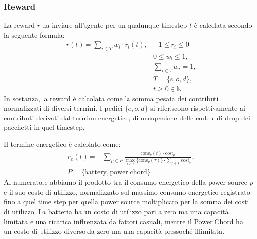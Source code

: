 \documentclass[conference]{IEEEtran}
\begin{document}
\subsubsection{Reward}
La reward $r$ da inviare all'agente per un qualunque timestep $t$ è calcolata secondo la
seguente formula:
\begin{equation}
    \label{eq:reward}
    \begin{aligned}
        & r(t) = \sum_{i \in T} w_i \cdot r_i(t), & -1 \leq r_i \leq 0\\
        && 0 \leq w_i \leq 1, \\
        && \sum_{i \in T} w_i = 1, \\
        && T = \{e, o, d\},\\
        && t \geq 0 \in \mathbb{N}
    \end{aligned}
\end{equation}
In sostanza, la reward è calcolata come la somma pesata dei contributi normalizzati di
diversi termini.
I pedici $\{e, o, d\}$ si riferiscono rispettivamente ai contributi derivati dal termine
energetico, di occupazione delle code e di drop dei pacchetti in quel timestep.

Il termine energetico è calcolato come:
\begin{equation}
    \label{eq:reward_energy}
    \begin{aligned}
        & r_e(t) = -\sum_{p \in P}\frac{\text{cons}_p(t) \cdot \text{cost}_p}{\max_{\tau < t}\{\text{cons}_p(\tau)\} \cdot \sum_{p \in P}\text{cost}_p},\\
        & P = \{\text{battery}, \text{power chord}\} 
    \end{aligned}
\end{equation}
Al numeratore abbiamo il prodotto tra il consumo energetico della power source $p$ e il
suo costo di utilizzo, normalizzato sul massimo consumo energetico registrato fino
a quel time step per quella power source moltiplicato per la somma dei costi di utilizzo.
La batteria
ha un costo di utilizzo pari a zero ma una capacità limitata e una ricarica influenzata
da fattori casuali, mentre il Power Chord ha un costo di utilizzo diverso da zero ma
una capacità pressoché illimitata.
\end{document}
